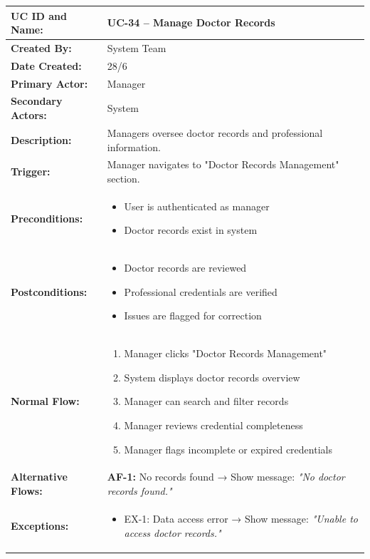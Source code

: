 \documentclass[12pt,a4paper]{article}
\begin{document}
\renewcommand{\arraystretch}{1.5}
\begin{longtable}{|p{4.5cm}|p{10.5cm}|}
\hline
\textbf{UC ID and Name:} & UC-34 – Manage Doctor Records \\
\hline
\textbf{Created By:} & System Team \\
\hline
\textbf{Date Created:} & 28/6 \\
\hline
\textbf{Primary Actor:} & Manager \\
\hline
\textbf{Secondary Actors:} & System \\
\hline
\textbf{Description:} & Managers oversee doctor records and professional information. \\
\hline
\textbf{Trigger:} & Manager navigates to "Doctor Records Management" section. \\
\hline
\textbf{Preconditions:} &
\begin{itemize}
  \item User is authenticated as manager
  \item Doctor records exist in system
\end{itemize} \\
\hline
\textbf{Postconditions:} &
\begin{itemize}
  \item Doctor records are reviewed
  \item Professional credentials are verified
  \item Issues are flagged for correction
\end{itemize} \\
\hline
\textbf{Normal Flow:} &
\begin{enumerate}
  \item Manager clicks "Doctor Records Management"
  \item System displays doctor records overview
  \item Manager can search and filter records
  \item Manager reviews credential completeness
  \item Manager flags incomplete or expired credentials
\end{enumerate} \\
\hline
\textbf{Alternative Flows:} &
\textbf{AF-1:} No records found → Show message: \textit{"No doctor records found."} \\
\hline
\textbf{Exceptions:} &
\begin{itemize}
  \item EX-1: Data access error → Show message: \textit{"Unable to access doctor records."}

\end{itemize}
\end{longtable}
\end{document}
